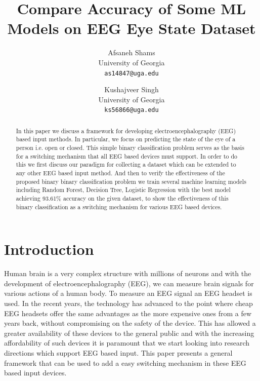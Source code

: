 \documentclass[10pt,twocolumn,letterpaper]{article}
\begin{document}
\title{Compare Accuracy of Some ML Models on EEG Eye State Dataset}

\author{Afsaneh Shams\\
University of Georgia\\
{\tt\small as14847@uga.edu}
\and
Kushajveer Singh\\
University of Georgia\\
{\tt\small ks56866@uga.edu}
}
\maketitle
\graphicspath{ {./images/} }
\begin{abstract}
   In this paper we discuss a framework for developing electroencephalography (EEG) based input methods. In particular, we focus on predicting the state of the eye of a person i.e. open or closed. This simple binary classification problem serves as the basis for a switching mechanism that all EEG based devices must support. In order to do this we first discuss our paradigm for collecting a dataset which can be extended to any other EEG based input method. And then to verify the effectiveness of the proposed binary binary classification problem we train several machine learning models including Random Forest, Decision Tree, Logistic Regression with the best model achieving 93.61\% accuracy on the given dataset, to show the effectiveness of this binary classification as a switching mechanism for various EEG based devices.
\end{abstract}

\section{Introduction}
\label{sec:intro}

Human brain is a very complex structure with millions of neurons and with the development of electroencephalography (EEG), we can measure brain signals for various actions of a human body. To measure an EEG signal an EEG headset is used. In the recent years, the technology has advanced to the point where cheap EEG headsets offer the same advantages as the more expensive ones from a few years back, without compromising on the safety of the device. This has allowed a greater availability of these devices to the general public and with the increasing affordability of such devices it is paramount that we start looking into research directions which support EEG based input. This paper presents a general framework that can be used to add a easy switching mechanism in these EEG based input devices.
\end{document}
